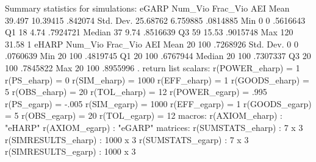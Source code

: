 Summary statistics for simulations:
{\smallskip}
       eGARP {\VBAR}   Num_Vio   Frac_Vio        AEI 
        Mean {\VBAR}    39.497   10.39415    .842074 
   Std. Dev. {\VBAR}  25.68762   6.759885   .0814885 
         Min {\VBAR}         0          0   .5616643 
          Q1 {\VBAR}        18       4.74   .7924721 
      Median {\VBAR}        37       9.74   .8516639 
          Q3 {\VBAR}        59      15.53   .9015748 
         Max {\VBAR}       120      31.58          1 
{\smallskip}
{\smallskip}
       eHARP {\VBAR}   Num_Vio   Frac_Vio        AEI 
        Mean {\VBAR}        20        100   .7268926 
   Std. Dev. {\VBAR}         0          0   .0760639 
         Min {\VBAR}        20        100   .4819745 
          Q1 {\VBAR}        20        100   .6767944 
      Median {\VBAR}        20        100   .7307337 
          Q3 {\VBAR}        20        100   .7845822 
         Max {\VBAR}        20        100   .8955996 
{\smallskip}
{\smallskip}
. return list
{\smallskip}
scalars:
        r(POWER_eharp) =  1
           r(PS_eharp) =  0
          r(SIM_eharp) =  1000
          r(EFF_eharp) =  1
        r(GOODS_eharp) =  5
          r(OBS_eharp) =  20
          r(TOL_eharp) =  12
        r(POWER_egarp) =  .995
           r(PS_egarp) =  -.005
          r(SIM_egarp) =  1000
          r(EFF_egarp) =  1
        r(GOODS_egarp) =  5
          r(OBS_egarp) =  20
          r(TOL_egarp) =  12
{\smallskip}
macros:
        r(AXIOM_eharp) : "eHARP"
        r(AXIOM_egarp) : "eGARP"
{\smallskip}
matrices:
     r(SUMSTATS_eharp) :  7 x 3
   r(SIMRESULTS_eharp) :  1000 x 3
     r(SUMSTATS_egarp) :  7 x 3
   r(SIMRESULTS_egarp) :  1000 x 3
{\smallskip}